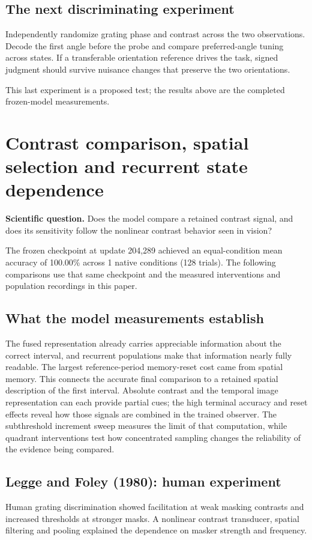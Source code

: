 \documentclass[11pt]{article}
\begin{document}
\subsection{The next discriminating experiment}
Independently randomize grating phase and contrast across the two observations. Decode the first angle before the probe and compare preferred-angle tuning across states. If a transferable orientation reference drives the task, signed judgment should survive nuisance changes that preserve the two orientations.

This last experiment is a proposed test; the results above are the completed frozen-model measurements.
\clearpage\section{Contrast comparison, spatial selection and recurrent state dependence}
\textbf{Scientific question.} Does the model compare a retained contrast signal, and does its sensitivity follow the nonlinear contrast behavior seen in vision?

The frozen checkpoint at update 204,289 achieved an equal-condition mean accuracy of 100.00\% across 1 native conditions (128 trials). The following comparisons use that same checkpoint and the measured interventions and population recordings in this paper.

\subsection{What the model measurements establish}
The fused representation already carries appreciable information about the correct interval, and recurrent populations make that information nearly fully readable. The largest reference-period memory-reset cost came from spatial memory. This connects the accurate final comparison to a retained spatial description of the first interval. Absolute contrast and the temporal image representation can each provide partial cues; the high terminal accuracy and reset effects reveal how those signals are combined in the trained observer. The subthreshold increment sweep measures the limit of that computation, while quadrant interventions test how concentrated sampling changes the reliability of the evidence being compared.

\subsection{Legge and Foley (1980): human experiment}
Human grating discrimination showed facilitation at weak masking contrasts and increased thresholds at stronger masks. A nonlinear contrast transducer, spatial filtering and pooling explained the dependence on masker strength and frequency. \cite{bio_legge}
\end{document}
